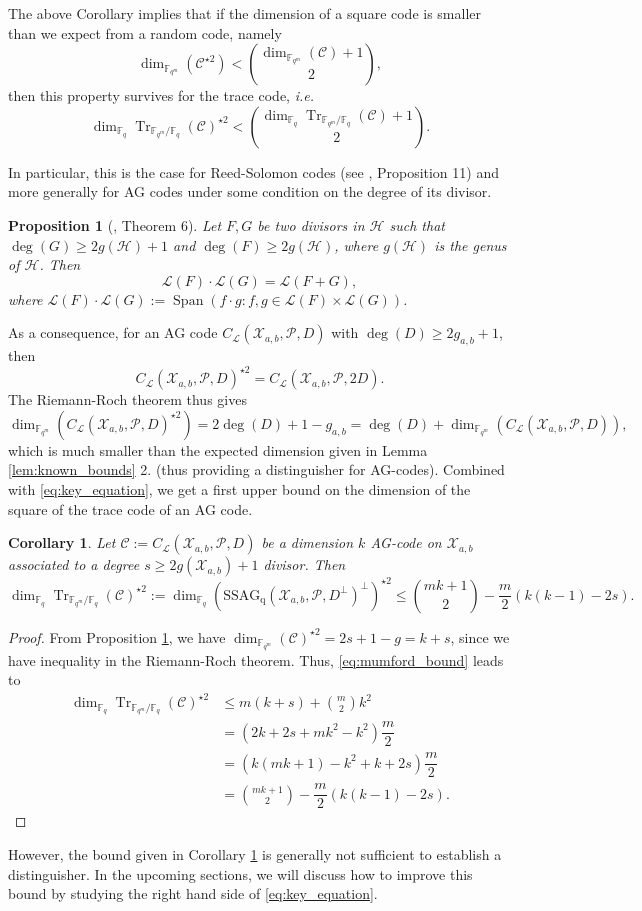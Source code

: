 \documentclass[a4paper]{article}
\newtheorem{proposition}[thm]{Proposition}
\newtheorem{coro}[thm]{Corollary}
\theoremstyle{definition}
\theoremstyle{remark}
\newcommand{\calP}{\mathcal{P}}
\newcommand{\calH}{\mathcal{H}}
\newcommand{\calL}{\mathcal{L}}
\newcommand{\calC}{\mathcal{C}}
\newcommand{\calX}{\mathcal{X}}
\newcommand{\fqm}{\mathbb{F}_{q^m}}
\newcommand{\fq}{\mathbb{F}_{q}}
\newcommand{\Tr}[1]{\operatorname{Tr}_{\mathbb{F}_{q^m}/\fq}\left(#1\right)}
\newcommand{\Span}[1]{\operatorname{Span}\left(#1\right)}
\newcommand{\ssag}[1]{\operatorname{SSAG_{q}}\left(#1\right)}
\begin{document}
The above Corollary implies that if the dimension of a square code is smaller than we expect from a random code, namely
\[ \dim_{\fqm} (\calC^{\star 2}) < \binom{\dim_{\fqm} (\calC)+1}{2},\]
then this property survives for the trace code, \emph{i.e.}
\[\dim_{\fq} \Tr{\calC}^{\star 2} < \binom{\dim_{\fq} \Tr{\calC}+1}{2}.\]

In particular, this is the case for Reed-Solomon codes (see \cite{MT21}, Proposition 11) and more generally for AG codes under some condition on the degree of its divisor.

\begin{proposition}[\cite{Mum70}, Theorem 6] \label{prop:mumford_result}
Let $F,G$ be two divisors in $\calH$ such that $\deg(G) \geq 2g(\calH)+1$ and $\deg(F) \geq 2g(\calH)$, where $g(\calH)$ is the genus of $\calH$. Then
\[ \calL(F) \cdot \calL(G) = \calL(F+G),\]
where $\calL(F) \cdot \calL(G) := \Span{ f \cdot g : f,g \in \calL(F) \times \calL(G)}$.
\end{proposition}

\noindent As a consequence, for an AG code  $C_{\calL}(\calX_{a,b},\mathcal{P},D)$ with $\deg(D) \geq 2g_{a,b}+1$, then 
\[ C_{\calL}(\calX_{a,b},\mathcal{P},D)^{\star2} = C_{\calL}(\calX_{a,b},\calP,2D).\]
The Riemann-Roch theorem thus gives
\[ \dim_{\fqm}(C_{\calL}(\calX_{a,b},\mathcal{P},D)^{\star2}) = 2\deg(D)+1-g_{a,b} = \deg(D) + \dim_{\fqm}(C_{\calL}(\calX_{a,b},\mathcal{P},D)), \]
which is much smaller than the expected dimension given in Lemma \ref{lem:known_bounds} 2. (thus providing a distinguisher for AG-codes). Combined with \eqref{eq:key_equation}, we get a first upper bound on the dimension of the square of the trace code of an AG code.


\begin{coro} \label{coro:1st_bound_mumford}
Let $\mathcal{C} := C_{\calL}(\calX_{a,b},\mathcal{P},D)$ be a dimension $k$ AG-code on $\calX_{a,b}$ associated to a degree $s \geq 2g(\calX_{a,b})+1$ divisor. Then
\[ \dim_{\fq}\Tr{\calC}^{\star2} := \dim_{\fq} (\ssag{\calX_{a,b},\calP,D^{\perp}}^{\perp})^{\star2}  \leq \binom{mk+1}{2} - \dfrac{m}{2} (k(k-1)-2s).\]
\end{coro}


\begin{proof}
From Proposition \ref{prop:mumford_result}, we have $\dim_{\fqm}(\calC)^{\star2} = 2s+1-g = k+s$, since we have inequality in the Riemann-Roch theorem. Thus, \eqref{eq:mumford_bound} leads to
\begin{align*}
   \dim_{\fq}\Tr{\calC}^{\star2} &\leq m(k+s) + \binom{m}{2}k^2 \\
                                       &= (2k+2s+mk^2-k^2) \dfrac{m}{2} \\
                                       &= (k(mk+1)-k^2+k+2s) \dfrac{m}{2} \\
                                       &= \binom{mk+1}{2} - \dfrac{m}{2}(k(k-1)-2s) .
\end{align*}
\end{proof}
However, the bound given in Corollary \ref{coro:1st_bound_mumford} is generally not sufficient to establish a distinguisher. In the upcoming sections, we will discuss how to improve this bound by studying the right hand side of \ref{eq:key_equation}.
\end{document}
